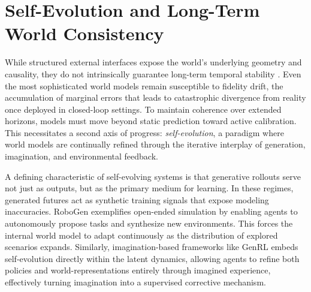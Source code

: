 \documentclass[pdflatex,sn-mathphys-num]{sn-jnl}
\theoremstyle{thmstyleone}%
\theoremstyle{thmstyletwo}%
\theoremstyle{thmstylethree}%
\begin{document}
\section{Self-Evolution and Long-Term World Consistency}
While structured external interfaces expose the world's underlying geometry and causality, they do not intrinsically guarantee long-term temporal stability \citep{mccloskey1989catastrophic}. Even the most sophisticated world models remain susceptible to fidelity drift, the accumulation of marginal errors that leads to catastrophic divergence from reality once deployed in closed-loop settings. To maintain coherence over extended horizons, models must move beyond static prediction toward active calibration. This necessitates a second axis of progress: \emph{self-evolution}, a paradigm where world models are continually refined through the iterative interplay of generation, imagination, and environmental feedback.

A defining characteristic of self-evolving systems is that generative rollouts serve not just as outputs, but as the primary medium for learning. In these regimes, generated futures act as synthetic training signals that expose modeling inaccuracies. RoboGen \citep{wang2023robogen} exemplifies open-ended simulation by enabling agents to autonomously propose tasks and synthesize new environments. This forces the internal world model to adapt continuously as the distribution of explored scenarios expands. Similarly, imagination-based frameworks like GenRL \citep{genrl} embeds self-evolution directly within the latent dynamics, allowing agents to refine both policies and world-representations entirely through imagined experience, effectively turning imagination into a supervised corrective mechanism. %
\end{document}
